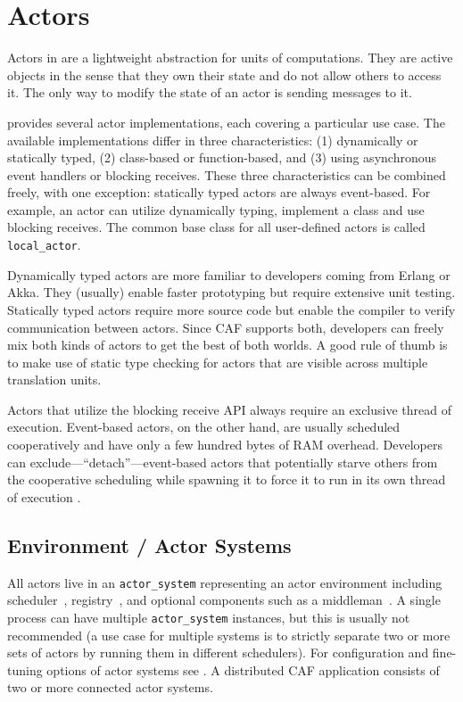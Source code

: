 \section{Actors}
\label{actor}

Actors in \lib are a lightweight abstraction for units of computations. They are active objects in the sense that they own their state and do not allow others to access it. The only way to modify the state of an actor is sending messages to it.

\lib provides several actor implementations, each covering a particular use case.
The available implementations differ in three characteristics: (1) dynamically or statically typed, (2) class-based or function-based, and (3) using asynchronous event handlers or blocking receives.
These three characteristics can be combined freely, with one exception: statically typed actors are always event-based.
For example, an actor can utilize dynamically typing, implement a class and use blocking receives.
The common base class for all user-defined actors is called \lstinline^local_actor^.

Dynamically typed actors are more familiar to developers coming from Erlang or Akka.
They (usually) enable faster prototyping but require extensive unit testing.
Statically typed actors require more source code but enable the compiler to verify communication between actors.
Since CAF supports both, developers can freely mix both kinds of actors to get the best of both worlds.
A good rule of thumb is to make use of static type checking for actors that are visible across multiple translation units.

Actors that utilize the blocking receive API always require an exclusive thread of execution. Event-based actors, on the other hand, are usually scheduled cooperatively and have only a few hundred bytes of RAM overhead. Developers can exclude---``detach''---event-based actors that potentially starve others from the cooperative scheduling while spawning it to force it to run in its own thread of execution .

\subsection{Environment / Actor Systems}
\label{actor-system}

All actors live in an \lstinline^actor_system^ representing an actor environment including scheduler~, registry~, and optional components such as a middleman~. A single process can have multiple \lstinline^actor_system^ instances, but this is usually not recommended (a use case for multiple systems is to strictly separate two or more sets of actors by running them in different schedulers). For configuration and fine-tuning options of actor systems see . A distributed CAF application consists of two or more connected actor systems.

